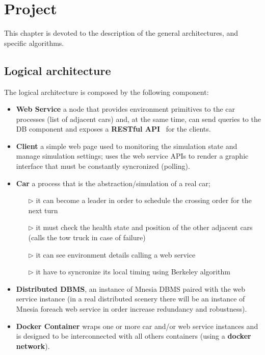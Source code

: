 \chapter{Project}\label{ch:project}

This chapter is devoted to the description of the general architectures, 
and specific algorithms.


\section{Logical architecture}

The logical architecture is composed by the following component:
\begin{itemize}
    \item \textbf{Web Service} a node that provides environment primitives to the 
        car processes (list of adjacent cars) and, at the same time, 
        can send queries to the DB component and exposes a \textbf{RESTful API}~\cite{9} 
        for the clients.
    \item \textbf{Client} a simple web page used to monitoring the simulation state
        and manage simulation settings; uses the web service APIs to render a 
        graphic interface that must be constantly syncronized (polling).
    \item \textbf{Car} a process that is the abstraction/simulation of a real car; 
        \begin{itemize}
            \item[$\rhd$] it can become a leader in order to schedule the crossing 
                order for the next turn
            \item[$\rhd$] it must check the health state and position of the other adjacent cars 
                (calls the tow truck in case of failure)
            \item[$\rhd$] it can see environment details calling a web service 
            \item[$\rhd$] it have to syncronize its local timing using Berkeley algorithm
        \end{itemize}
    \item \textbf{Distributed DBMS}, an instance of Mnesia DBMS paired 
        with the web service instance 
        (in a real distributed scenery there will be an instance of Mnesia 
        foreach web service in order increase redundancy and robustness). 
    \item \textbf{Docker Container} wraps one or more car and/or web service instances 
        and is designed to be interconnected with all others containers 
        (using a \textbf{docker network}). 
    \end{itemize}


